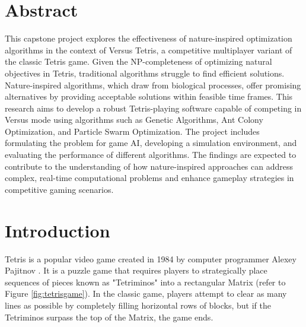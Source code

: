 \documentclass[a4paper, 12pt]{extreport}
\begin{document}
	
	\chapter*{Abstract}
	
		This capstone project explores the effectiveness of nature-inspired optimization algorithms in the context of Versus Tetris, a competitive multiplayer variant of the classic Tetris game. Given the NP-completeness of optimizing natural objectives in Tetris, traditional algorithms struggle to find efficient solutions. Nature-inspired algorithms, which draw from biological processes, offer promising alternatives by providing acceptable solutions within feasible time frames. This research aims to develop a robust Tetris-playing software capable of competing in Versus mode using algorithms such as Genetic Algorithms, Ant Colony Optimization, and Particle Swarm Optimization. The project includes formulating the problem for game AI, developing a simulation environment, and evaluating the performance of different algorithms. The findings are expected to contribute to the understanding of how nature-inspired approaches can address complex, real-time computational problems and enhance gameplay strategies in competitive gaming scenarios.
	
	
	\tableofcontents
	
	\listoftables
	
	\listoffigures
	
	\chapter{Introduction}
	
		
		Tetris is a popular video game created in 1984 by computer programmer Alexey Pajitnov  \cite{about-tetris}. It is a puzzle game that requires players to strategically place sequences of pieces known as "Tetriminos" into a rectangular Matrix (refer to Figure \ref{fig:tetrisgame}). In the classic game, players attempt to clear as many lines as possible by completely filling horizontal rows of blocks, but if the Tetriminos surpass the top of the Matrix, the game ends.
		
\end{document}
